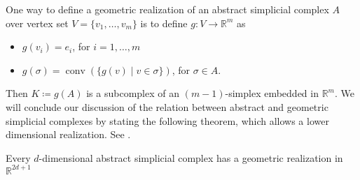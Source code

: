 One way to define a geometric realization of an abstract simplicial complex $A$ over vertex set $V = \{v_1,\dots,v_m\}$ is to define $g:V \rightarrow \mathbb{R}^m$ as \begin{itemize}
    \item $g(v_i) = e_i$,  for $i = 1, \dots, m$ 
    \item $g(\sigma) = \operatorname{conv}(\{g(v) \mid v \in \sigma \})$, for $\sigma \in A$. 
\end{itemize}
Then $K \coloneqq g(A)$ is a subcomplex of an $(m-1)$-simplex embedded in $\mathbb{R}^{m}$. 
We will conclude our discussion of the relation between abstract and geometric simplicial complexes by stating the following theorem, which allows a lower dimensional realization. See \cite[p.64]{Computational+Topology}.

\begin{thm}
    Every $d$-dimensional abstract simplicial complex has a geometric realization in $\mathbb{R}^{2d+1}$
\end{thm}

